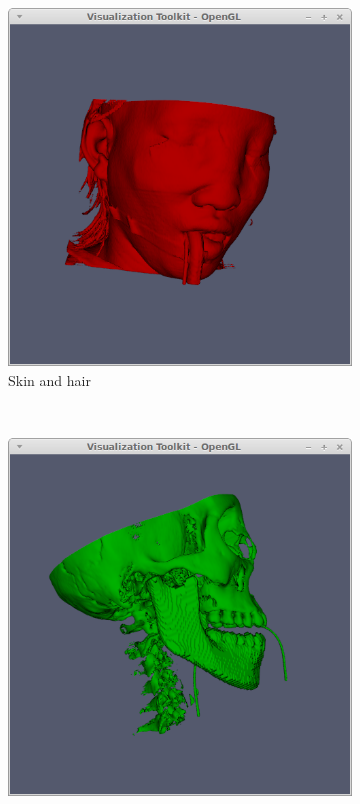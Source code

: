 \documentclass{article}[10pt]
\begin{document}
\begin{figure}[h]
	\centering
	\begin{subfigure}[b]{0.3\textwidth}
		\includegraphics[width=\textwidth]{red}
		\caption{Skin and hair}
		\label{fig:red}
	\end{subfigure}~
	\begin{subfigure}[b]{0.3\textwidth}
		\includegraphics[width=\textwidth]{green}

\end{subfigure}
\end{figure}
\end{document}
